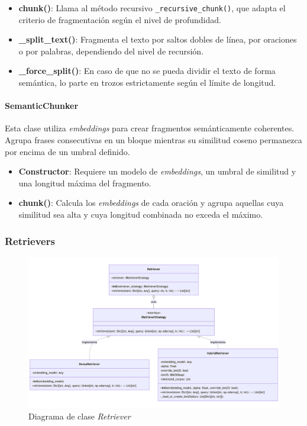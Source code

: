 \documentclass[12pt,letterpaper]{article}
\begin{document}
\begin{itemize}
    \item \textbf{chunk()}: Llama al método recursivo \texttt{\_recursive\_chunk()}, que adapta el criterio de fragmentación según el nivel de profundidad.
    \item \textbf{\_split\_text()}: Fragmenta el texto por saltos dobles de línea, por oraciones o por palabras, dependiendo del nivel de recursión.
    \item \textbf{\_force\_split()}: En caso de que no se pueda dividir el texto de forma semántica, lo parte en trozos estrictamente según el límite de longitud.
\end{itemize}

\paragraph{SemanticChunker}

Esta clase utiliza \textit{embeddings} para crear fragmentos semánticamente coherentes. Agrupa frases consecutivas en un bloque mientras su similitud coseno permanezca por encima de un umbral definido.

\begin{itemize}
    \item \textbf{Constructor}: Requiere un modelo de \textit{embeddings}, un umbral de similitud y una longitud máxima del fragmento.
    \item \textbf{chunk()}: Calcula los \textit{embeddings} de cada oración y agrupa aquellas cuya similitud sea alta y cuya longitud combinada no exceda el máximo.
\end{itemize}

\subsubsection{Retrievers}

\begin{figure}[htp]
    \centering
    \includegraphics[width=1\linewidth]{img/retriever.png}
    \caption{Diagrama de clase \textit{Retriever}}
    \label{fig:retriever}
\end{figure}
\end{document}
